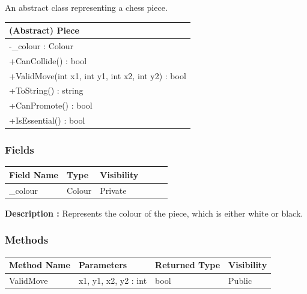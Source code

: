 \documentclass[12pt]{article}
\begin{document}
    An abstract class representing a chess piece.
\begin{table}[H]
    \begin{tabular}{|l|}
    \hline
    \cellcolor[HTML]{C0C0C0}\textbf{(Abstract) Piece}  \\ \hline
    \cellcolor[HTML]{EFEFEF}-\_colour : Colour         \\ \hline
    +CanCollide() : bool                               \\ \hline
    +ValidMove(int x1, int y1, int x2, int y2) : bool  \\ \hline
    +ToString() : string                               \\ \hline
    +CanPromote() : bool                               \\ \hline
    +IsEssential() : bool                              \\ \hline
    \end{tabular}
\end{table}

\subsubsection{Fields}

\begin{table}[H]
    \begin{tabular}{llllll}
    \hline
    \multicolumn{1}{|l|}{\cellcolor[HTML]{EFEFEF}\textbf{Field Name}} & \multicolumn{1}{l|}{\cellcolor[HTML]{EFEFEF}\textbf{Type}} & \multicolumn{1}{l|}{\cellcolor[HTML]{EFEFEF}\textbf{Visibility}} \\ \hline
    \multicolumn{1}{|l|}{\_colour}                                    & \multicolumn{1}{l|}{Colour}                                & \multicolumn{1}{l|}{Private}                                     \\ \hline
    \end{tabular}
\end{table}

    \textbf{Description :} Represents the colour of the piece, which is either white or black.

\subsubsection{Methods}

\begin{table}[H]
    \begin{tabular}{|l|l|l|l|}
    \hline
    \rowcolor[HTML]{EFEFEF} 
    \cellcolor[HTML]{EFEFEF}\textbf{Method Name} & \textbf{Parameters}  & \textbf{Returned Type} & \textbf{Visibility} \\ \hline
    ValidMove                          & x1, y1, x2, y2 : int & bool                   & Public              \\ \hline
    \end{tabular}
\end{table}
\end{document}
